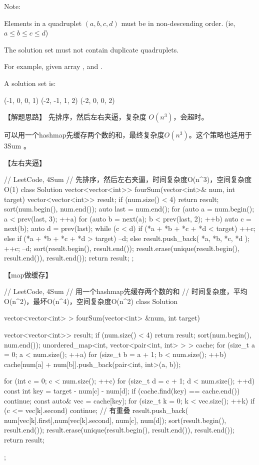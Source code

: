 Note:
\begindot
\item Elements in a quadruplet $(a,b,c,d)$ must be in non-descending order.
(ie, $a \leq b \leq c \leq d$)
\item The solution set must not contain duplicate quadruplets.
\myenddot

For example, given array , and .

A solution set is:
\begin{Code}
	(-1,  0, 0, 1)
	(-2, -1, 1, 2)
	(-2,  0, 0, 2)
\end{Code}


【解题思路】
先排序，然后左右夹逼，复杂度 $O(n^3)$，会超时。

可以用一个hashmap先缓存两个数的和，最终复杂度$O(n^3)$。这个策略也适用于 3Sum 。


【左右夹逼】
\begin{Code}
	// LeetCode, 4Sum
	// 先排序，然后左右夹逼，时间复杂度O(n^3)，空间复杂度O(1)
	class Solution {
		vector<vector<int>> fourSum(vector<int>& num, int target) {
			vector<vector<int>> result;
			if (num.size() < 4) return result;
			sort(num.begin(), num.end());
			auto last = num.end();
			for (auto a = num.begin(); a < prev(last, 3); ++a) {
				for (auto b = next(a); b < prev(last, 2); ++b) {
					auto c = next(b);
					auto d = prev(last);
					while (c < d) {
						if (*a + *b + *c + *d < target) {
							++c;
						} else if (*a + *b + *c + *d > target) {
							--d;
						} else {
							result.push_back({ *a, *b, *c, *d });
							++c;
							--d;
						}
					}
				}
			}
			sort(result.begin(), result.end());
			result.erase(unique(result.begin(), result.end()), result.end());
			return result;
		}
	};
\end{Code}


【map做缓存】
\begin{Code}
	// LeetCode, 4Sum
	// 用一个hashmap先缓存两个数的和
	// 时间复杂度，平均O(n^2)，最坏O(n^4)，空间复杂度O(n^2)
	class Solution {
		vector<vector<int> > fourSum(vector<int> &num, int target) {
			vector<vector<int>> result;
			if (num.size() < 4) return result;
			sort(num.begin(), num.end());
			unordered_map<int, vector<pair<int, int> > > cache;
			for (size_t a = 0; a < num.size(); ++a) {
				for (size_t b = a + 1; b < num.size(); ++b)
					cache[num[a] + num[b]].push_back(pair<int, int>(a, b));
			}
			
			for (int c = 0; c < num.size(); ++c) {
				for (size_t d = c + 1; d < num.size(); ++d) {
					const int key = target - num[c] - num[d];
					if (cache.find(key) == cache.end()) continue;
					const auto& vec = cache[key];
					for (size_t k = 0; k < vec.size(); ++k) {
						if (c <= vec[k].second)
						continue; // 有重叠
						result.push_back( {num[vec[k].first],num[vec[k].second], num[c], num[d]});
					}
				}
			}
			sort(result.begin(), result.end());
			result.erase(unique(result.begin(), result.end()), result.end());
			return result;
		}
	};
\end{Code}


